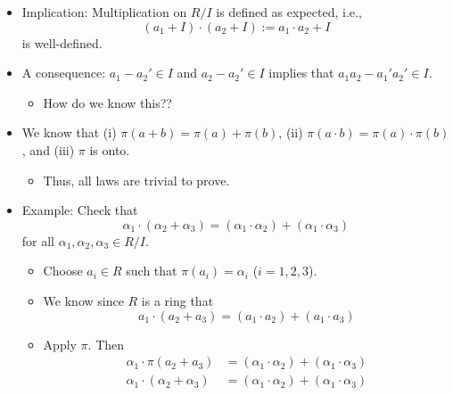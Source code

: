 \documentclass[../notes.tex]{subfiles}
\begin{document}
\begin{itemize}
    \item Implication: Multiplication on $R/I$ is defined as expected, i.e.,
    \begin{equation*}
        (a_1+I)\cdot(a_2+I) := a_1\cdot a_2+I
    \end{equation*}
    is well-defined.
    \item A consequence: $a_1-a_2'\in I$ and $a_2-a_2'\in I$ implies that $a_1a_2-a_1'a_2'\in I$.
    \begin{itemize}
        \item How do we know this??
    \end{itemize}
    \item We know that (i) $\pi(a+b)=\pi(a)+\pi(b)$, (ii) $\pi(a\cdot b)=\pi(a)\cdot\pi(b)$, and (iii) $\pi$ is onto.
    \begin{itemize}
        \item Thus, all laws are trivial to prove.
    \end{itemize}
    \item Example: Check that
    \begin{equation*}
        \alpha_1\cdot(\alpha_2+\alpha_3) = (\alpha_1\cdot\alpha_2)+(\alpha_1\cdot\alpha_3)
    \end{equation*}
    for all $\alpha_1,\alpha_2,\alpha_3\in R/I$.
    \begin{itemize}
        \item Choose $a_i\in R$ such that $\pi(a_i)=\alpha_i$ ($i=1,2,3$).
        \item We know since $R$ is a ring that
        \begin{equation*}
            a_1\cdot(a_2+a_3) = (a_1\cdot a_2)+(a_1\cdot a_3)
        \end{equation*}
        \item Apply $\pi$. Then
        \begin{align*}
            \alpha_1\cdot\pi(a_2+a_3) &= (\alpha_1\cdot\alpha_2)+(\alpha_1\cdot\alpha_3)\\
            \alpha_1\cdot(\alpha_2+\alpha_3) &= (\alpha_1\cdot\alpha_2)+(\alpha_1\cdot\alpha_3)
        \end{align*}
    \end{itemize}
\end{itemize}
\end{document}
